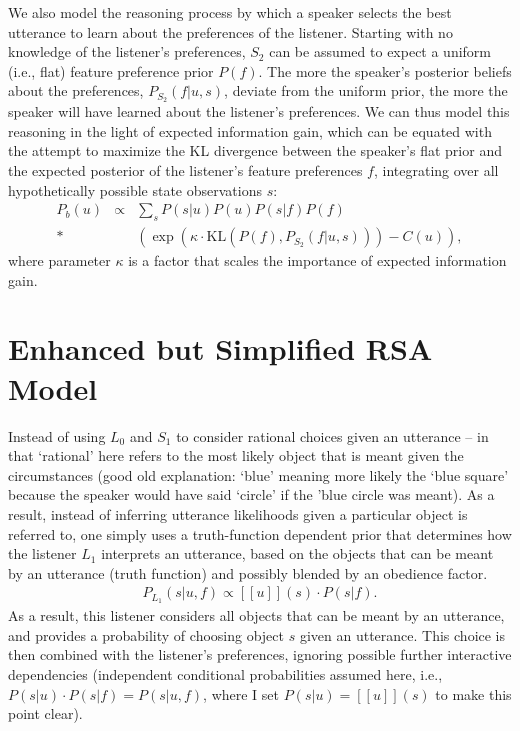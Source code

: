 \documentclass[10pt,a4paper]{article}
\begin{document}
We also model the reasoning process by which a speaker selects the best utterance to learn about the preferences of the listener.
Starting with no knowledge of the listener's preferences, $S_2$ can be assumed to expect a uniform (i.e., flat) feature preference prior $P(f)$. The more the speaker's posterior beliefs about the preferences, $P_{S_{2}}(f|u,s)$, deviate from the uniform prior, the more the speaker will have learned about the listener's preferences. 
We can thus model this reasoning in the light of expected information gain, which can be equated with the attempt to maximize the KL divergence between the speaker's flat prior and the expected posterior of the listener's feature preferences $f$, integrating over all hypothetically possible state observations $s$:
\begin{eqnarray}
P_{b}(u) &\propto& \sum_{s} P(s|u) P(u) P(s|f) P(f) \\*
&& \left( \exp \left( \kappa \cdot \textrm{KL}(P(f),P_{S_{2}}(f|u,s)) \right) - C(u) \right),
\end{eqnarray}
where parameter $\kappa$ is a factor that scales the importance of expected information gain. 


\section{Enhanced but Simplified RSA Model}
Instead of using $L_0$ and $S_1$ to consider rational choices given an utterance -- in that `rational' here refers to the most likely object that is meant given the circumstances (good old explanation: `blue' meaning more likely the `blue square' because the speaker would have said `circle' if the 'blue circle was meant).
As a result, instead of inferring utterance likelihoods given a particular object is referred to, 
one simply uses a truth-function dependent prior that determines how the listener $L_1$ interprets an utterance, based on the objects that can be meant by an utterance (truth function) and possibly blended by an obedience factor. 
\begin{gather}
P_{L_{1}}(s|u,f) \propto [[u]](s) \cdot P(s|f).
\end{gather}
As a result, this listener considers all objects that can be meant by an utterance, and provides a probability of choosing object $s$ given an utterance. 
This choice is then combined with the listener's preferences, ignoring possible further interactive dependencies (independent conditional probabilities assumed here, i.e., $P(s|u) \cdot P(s|f) = P(s|u,f)$, where I set $P(s|u)=[[u]](s)$ to make this point clear). 
\end{document}
